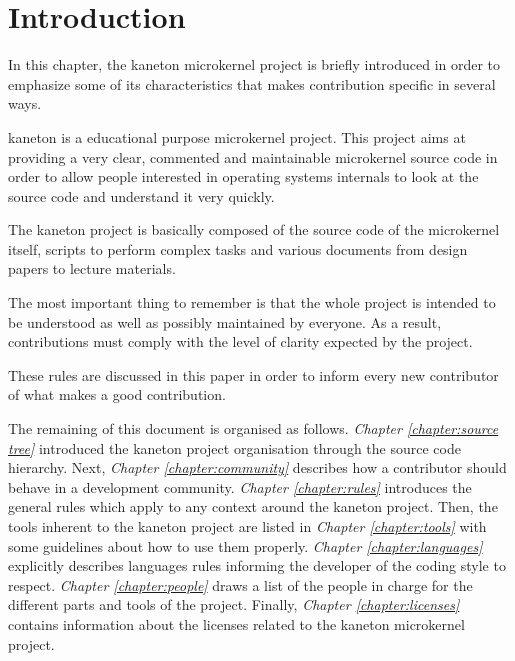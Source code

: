 %
%
%
%
%
%

%
%

\chapter{Introduction}
\label{chapter:environment}

In this chapter, the kaneton microkernel project is briefly introduced
in order to emphasize some of its characteristics that makes contribution
specific in several ways.

\newpage

%
%

kaneton is a educational purpose microkernel project. This project aims
at providing a very clear, commented and maintainable microkernel source
code in order to allow people interested in operating systems internals
to look at the source code and understand it very quickly.

The kaneton project is basically composed of the source code of the
microkernel itself, scripts to perform complex tasks and various documents
from design papers to lecture materials.

The most important thing to remember is that the whole project is intended
to be understood as well as possibly maintained by everyone. As a result,
contributions must comply with the level of clarity expected by the project.

These rules are discussed in this paper in order to inform every new
contributor of what makes a good contribution.

The remaining of this document is organised as follows.
\textit{Chapter \ref{chapter:source tree}} introduced the kaneton project
organisation through the source code hierarchy. Next, \textit{Chapter
\ref{chapter:community}} describes how a contributor should behave in a
development community. \textit{Chapter \ref{chapter:rules}} introduces the
general rules which apply to any context around the kaneton project. Then,
the tools inherent to the kaneton project are listed in \textit{Chapter
\ref{chapter:tools}} with some guidelines about how to use them properly.
\textit{Chapter \ref{chapter:languages}} explicitly describes languages rules
informing the developer of the coding style to respect. \textit{Chapter
\ref{chapter:people}} draws a list of the people in charge for the different
parts and tools of the project. Finally, \textit{Chapter
\ref{chapter:licenses}} contains information about the licenses related to
the kaneton microkernel project.
